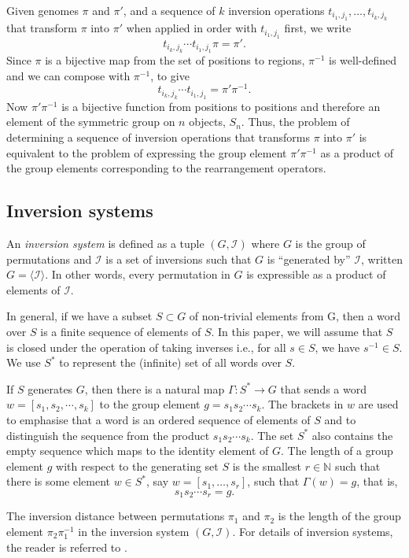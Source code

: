 \documentclass[utf8]{Frontiers_LaTex_Templates/frontiersFPHY} %
\newcommand{\invset}{\mathcal{I}}
\newcommand{\tij}[1]{t_{#1}}
\numberwithin{equation}{section}
\begin{document}
Given genomes $\pi$ and $\pi'$, and a sequence of $k$ inversion operations $t_{i_1,j_1},\dots,t_{i_k,j_k}$ that transform $\pi$ into $\pi'$ when applied in order with $t_{i_1,j_1}$ first, we write
\[\tij{i_k, j_k} \cdots \tij{i_1, j_1}\pi = \pi'.\]
% 
Since $\pi$ is a bijective map from the set of positions to regions, $\pi^{-1}$ is well-defined and we can compose with $\pi^{-1}$, to give
\[\tij{i_k, j_k} \cdots \tij{i_1, j_1}= \pi' \pi^{-1}.\]
%
Now $\pi' \pi^{-1}$ is a bijective function from positions to positions and therefore an element of the symmetric group on $n$ objects, $S_n$. Thus, the problem of determining a sequence of inversion operations that transforms $\pi$ into $\pi'$ is equivalent to the problem of expressing the group element $\pi'\pi^{-1}$ as a product of the group elements corresponding to the rearrangement operators.

\subsection*{Inversion systems}

An \emph{inversion system} is defined as a tuple $(G, \invset)$ where $G$ is the group of permutations and $\invset$ is a set of inversions such that $G$ is ``generated by'' $\invset$, written $G = \langle \invset \rangle$. In other words, every permutation in $G$ is expressible as a product of elements of $\invset$. 

In general, if we have a subset $S \subset G$ of non-trivial elements from G, then a word over $S$ is a finite sequence of elements of $S$. In this paper, we will assume that $S$ is closed under the operation of taking inverses i.e., for all $s \in S$, we have $s^{-1} \in S$.  We use $S^*$ to represent the (infinite) set of all words over $S$. 

If $S$ generates $G$, then there is a natural map $\Gamma: S^* \rightarrow G$ that sends a word $w = [s_1, s_2,  \cdots ,s_k]$ to the group element $g = s_1 s_2 \cdots s_k$.
The brackets in $w$ are used to emphasise that a word is an ordered sequence of elements of $S$ and to distinguish the sequence from the product $s_1s_2 \cdots s_k$. The set $S^*$ also contains the empty sequence which maps to the identity element of $G$. The length of a group element $g$ with respect to the generating set $S$ is the smallest $r \in \mathbb{N}$ such that there is some element $w \in S^*$, say $w = [s_1, \hdots ,s_r]$, such that $\Gamma(w) = g$, that is, 
\[ s_1 s_2 \cdots s_r = g.\]


The inversion distance between permutations $\pi_1$ and $\pi_2$ is the length of the group element $\pi_2 \pi_1^{-1}$ in the inversion system $(G, \invset)$. For details of inversion systems, the reader is referred to \citet{egrinagy2013group}. 
\end{document}
